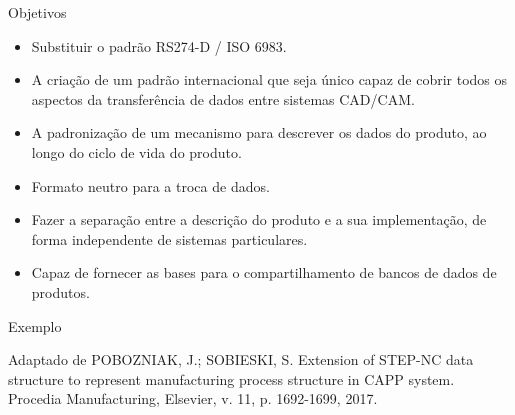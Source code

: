 \documentclass[aspectratio=169]{beamer}
\begin{document}
{\begin{frame}{Objetivos}
  \begin{itemize}
    \item {
      Substituir o padrão RS274-D / ISO 6983.
    }
    \item{
      A criação de um padrão internacional que seja único capaz de cobrir todos os aspectos 
      da transferência de dados entre sistemas CAD/CAM.
    }
    \item {
      A padronização de um mecanismo para descrever os dados do produto, ao longo do ciclo de 
      vida do produto.
    }
    \item {
      Formato neutro para a troca de dados.
    }
    \item {
      Fazer a separação entre a descrição do produto e a sua implementação, 
      de forma independente de sistemas particulares.
    }
    \item {
      Capaz de fornecer as bases para o compartilhamento de bancos de dados de produtos.
    }
  \end{itemize}
\end{frame}


\begin{frame}{Exemplo}

  Adaptado de POBOZNIAK, J.; SOBIESKI, S. Extension of STEP-NC data structure to represent
  manufacturing process structure in CAPP system. Procedia Manufacturing, Elsevier,
  v. 11, p. 1692-1699, 2017.


\end{frame}}
\end{document}
